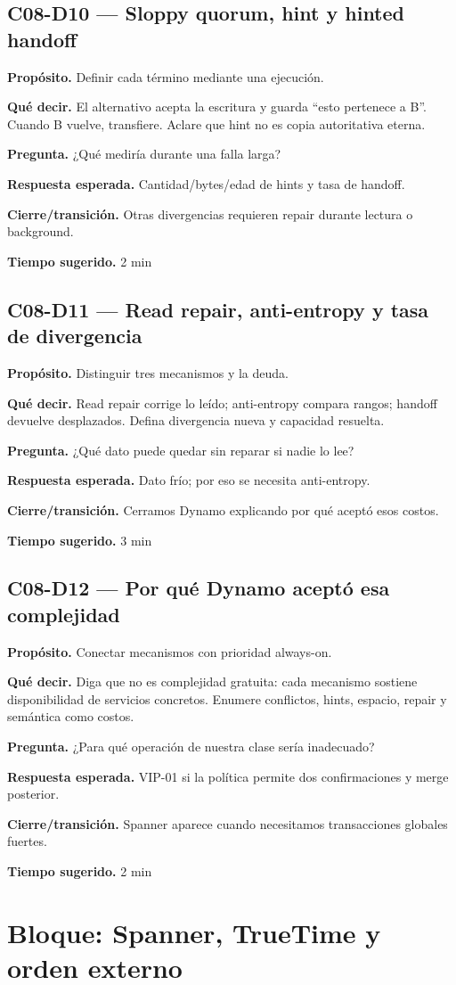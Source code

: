 \documentclass[variant=docente,cover=institutional,mode=screen]{ua-engineering-v6-article}
\newcommand{\FrameField}[2]{\par\noindent\textbf{#1.} #2\par}
\begin{document}
\subsection*{C08-D10 --- Sloppy quorum, hint y hinted handoff}
\FrameField{Propósito}{Definir cada término mediante una ejecución.}
\FrameField{Qué decir}{El alternativo acepta la escritura y guarda “esto pertenece a B”. Cuando B vuelve, transfiere. Aclare que hint no es copia autoritativa eterna.}
\FrameField{Pregunta}{¿Qué mediría durante una falla larga?}
\FrameField{Respuesta esperada}{Cantidad/bytes/edad de hints y tasa de handoff.}
\FrameField{Cierre/transición}{Otras divergencias requieren repair durante lectura o background.}
\FrameField{Tiempo sugerido}{2 min}

\subsection*{C08-D11 --- Read repair, anti-entropy y tasa de divergencia}
\FrameField{Propósito}{Distinguir tres mecanismos y la deuda.}
\FrameField{Qué decir}{Read repair corrige lo leído; anti-entropy compara rangos; handoff devuelve desplazados. Defina divergencia nueva y capacidad resuelta.}
\FrameField{Pregunta}{¿Qué dato puede quedar sin reparar si nadie lo lee?}
\FrameField{Respuesta esperada}{Dato frío; por eso se necesita anti-entropy.}
\FrameField{Cierre/transición}{Cerramos Dynamo explicando por qué aceptó esos costos.}
\FrameField{Tiempo sugerido}{3 min}

\subsection*{C08-D12 --- Por qué Dynamo aceptó esa complejidad}
\FrameField{Propósito}{Conectar mecanismos con prioridad always-on.}
\FrameField{Qué decir}{Diga que no es complejidad gratuita: cada mecanismo sostiene disponibilidad de servicios concretos. Enumere conflictos, hints, espacio, repair y semántica como costos.}
\FrameField{Pregunta}{¿Para qué operación de nuestra clase sería inadecuado?}
\FrameField{Respuesta esperada}{VIP-01 si la política permite dos confirmaciones y merge posterior.}
\FrameField{Cierre/transición}{Spanner aparece cuando necesitamos transacciones globales fuertes.}
\FrameField{Tiempo sugerido}{2 min}

\section{Bloque: Spanner, TrueTime y orden externo}
\end{document}
